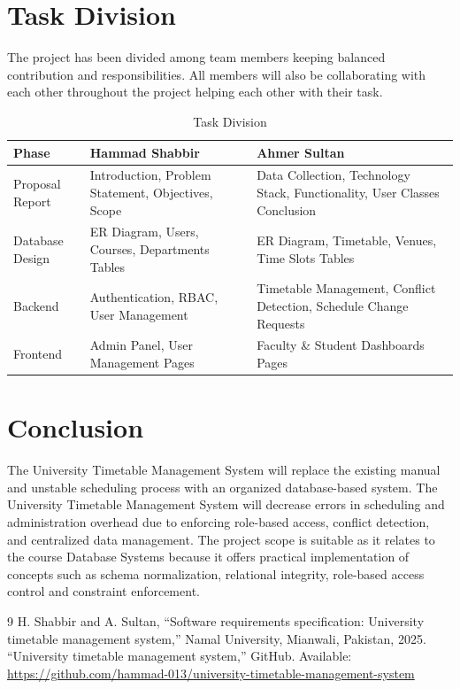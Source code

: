 \documentclass[12pt, a4paper]{report}
\begin{document}
\section{Task Division}
The project has been divided among team members keeping balanced contribution and responsibilities. All members will also be collaborating with each other throughout the project helping each other with their task.
\vspace{0.5em}
\begin{table}[H]
\centering
\small
\begin{tabular}{@{} p{3cm} p{6cm} p{6cm} @{}}
\toprule
\textbf{Phase} & \textbf{Hammad Shabbir} & \textbf{Ahmer Sultan} \\
\midrule
Proposal Report &
Introduction, Problem Statement, Objectives, Scope &
Data Collection, Technology Stack, Functionality, User Classes Conclusion \\
\addlinespace
Database Design &
ER Diagram, Users, Courses, Departments Tables &
ER Diagram, Timetable, Venues, Time Slots Tables \\
\addlinespace
Backend &
Authentication, RBAC, User Management &
Timetable Management, Conflict Detection, Schedule Change Requests \\
\addlinespace
Frontend &
Admin Panel, User Management Pages &
Faculty \& Student Dashboards Pages \\
\bottomrule
\end{tabular}
\caption{Task Division}
\label{tab:task-division}
\end{table}

\section{Conclusion}

The University Timetable Management System will replace the existing manual and unstable scheduling process with an organized database-based system. The University Timetable Management System will decrease errors in scheduling and administration overhead due to enforcing role-based access, conflict detection, and centralized data management. The project scope is suitable as it relates to the course Database Systems because it offers practical implementation of concepts such as schema normalization, relational integrity, role-based access control and constraint enforcement.

\renewcommand{\bibname}{References}
\begin{thebibliography}{9}
H. Shabbir and A. Sultan, ``Software requirements specification: University timetable management system,'' Namal University, Mianwali, Pakistan, 2025.
``University timetable management system,'' GitHub. Available: \url{https://github.com/hammad-013/university-timetable-management-system}
\end{thebibliography}
\end{document}
